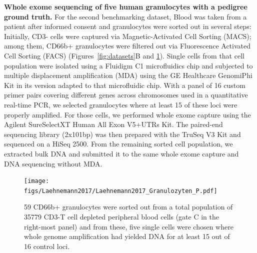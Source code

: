 \documentclass[authoryear,preprint,11pt]{scrartcl}
\begin{document}
\textbf{Whole exome sequencing of five human granulocytes with a pedigree ground truth.}
For the second benchmarking dataset, Blood was taken from a patient after informed consent and granulocytes were sorted out in several steps: Initially, CD3- cells were captured via Magnetic-Activated Cell Sorting (MACS); among them, CD66b+ granulocytes were filtered out via Fluorescence Activated Cell Sorting (FACS) (Figures~\ref{fig:datasets}B and \ref{fig:FACS-scheme}).
Single cells from that cell population were isolated using a Fluidigm C1 microfluidics chip and subjected to multiple displacement amplification (MDA) using the GE Healthcare GenomiPhi Kit in its version adapted to that microfluidic chip.
With a panel of 16 custom primer pairs covering different genes across chromosomes used in a quantitative real-time PCR, we selected granulocytes where at least 15 of these loci were properly amplified.
For those cells, we performed whole exome capture using the Agilent SureSelectXT Human All Exon V5+UTRs Kit.
The paired-end sequencing library (2x101bp) was then prepared with the TruSeq V3 Kit and sequenced on a HiSeq 2500.
From the remaining sorted cell population, we extracted bulk DNA and submitted it to the same whole exome capture and DNA sequencing without MDA.\\

\begin{figure}[!tpb]
 \texttt{[image: figs/Laehnemann2017/Laehnemann2017\_Granulozyten\_P.pdf]}
 \caption{
 59 CD66b+ granulocytes were sorted out from a total population of 35779 CD3-T cell depleted peripheral blood cells (gate C in the right-most panel) and from these, five single cells were chosen where whole genome amplification had yielded DNA for at least 15 out of 16 control loci.
 }
 \label{fig:FACS-scheme}
\end{figure}
\end{document}
